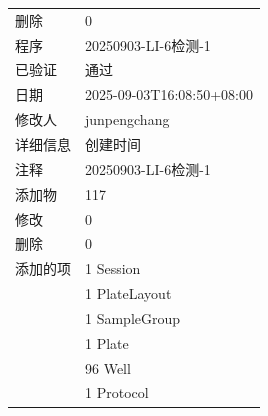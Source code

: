 \documentclass[UTF8,10pt,a4paper,fontset=fandol]{ctexart}
\newcommand{\fieldvalue}[1]{#1}
\begin{document}
\small
\begin{tabular}{@{}p{2.5cm}p{12cm}@{}}
删除 &
\fieldvalue{0} \\

程序 &
\fieldvalue{20250903-LI-6检测-1} \\

已验证 &
\fieldvalue{通过} \\

日期 &
\fieldvalue{2025-09-03T16:08:50+08:00} \\

修改人 &
\fieldvalue{junpengchang} \\

详细信息 &
\fieldvalue{创建时间} \\

注释 &
\fieldvalue{20250903-LI-6检测-1} \\

添加物 &
\fieldvalue{117} \\

修改 &
\fieldvalue{0} \\

删除 &
\fieldvalue{0} \\

添加的项 &
\fieldvalue{1 Session} \\

&
\fieldvalue{1 PlateLayout} \\

&
\fieldvalue{1 SampleGroup} \\

&
\fieldvalue{1 Plate} \\

&
\fieldvalue{96 Well} \\

&
\fieldvalue{1 Protocol} \\


\end{tabular}
\end{document}
